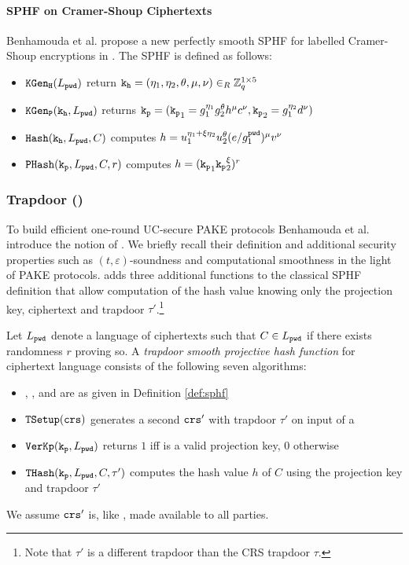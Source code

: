 \paragraph{SPHF on Cramer-Shoup Ciphertexts}
Benhamouda et al. propose a new perfectly smooth SPHF for labelled Cramer-Shoup encryptions in \cite{Benhamouda2013}.
The SPHF is defined as follows:
\begin{itemize}
  \item $\mathtt{KGen_H}(L_\mathtt{pwd})$ return $\mathtt{k_h}=(\eta_1,\eta_2,\theta,\mu,\nu)\in_R\mathbb{Z}_q^{1\times 5}$
  \item $\mathtt{KGen_P}(\mathtt{k_h}, L_\mathtt{pwd})$ returns $\mathtt{k_p}=(\mathtt{k_p}_1=g_1^{\eta_1} g_2^{\theta} h^\mu c^\nu, \mathtt{k_p}_2=g_1^{\eta_2} d^{\nu})$
  \item $\mathtt{Hash}(\mathtt{k_h}, L_\mathtt{pwd}, C)$ computes $h=u_1^{\eta_1+\xi\eta_2} u_2^{\theta} (e/g_1^{\mathtt{pwd}})^\mu v^\nu$
  \item $\mathtt{PHash}(\mathtt{k_p}, L_\mathtt{pwd}, C, r)$ computes $h=(\mathtt{k_p}_1 \mathtt{k_p}_2^\xi)^r$
\end{itemize}

\subsubsection{Trapdoor \SPHF (\TSPHF)}\label{sec:tsphf}
To build efficient one-round UC-secure PAKE protocols Benhamouda et al. \cite{Benhamouda2013} introduce the notion of \TSPHF.
We briefly recall their definition and additional security properties such as $(t,\varepsilon)$-soundness and computational smoothness in the light of PAKE protocols.
\TSPHF adds three additional functions to the classical SPHF definition that allow computation of the hash value knowing only the projection key, ciphertext and trapdoor $\tau'$.\footnote{Note that $\tau'$ is a different trapdoor than the CRS trapdoor $\tau$.}

\begin{definition}\label{def:tsphf}
Let $L_\mathtt{pwd}$ denote a language of ciphertexts such that $C\in L_\mathtt{pwd}$ if there exists randomness $r$ proving so.
A \emph{trapdoor smooth projective hash function} for ciphertext language \Lpwd consists of the following seven algorithms:

\begin{itemize}
  \item \HKGen, \PKGen, \Hash and \PHash are as given in Definition \ref{def:sphf}
	\item $\mathtt{TSetup}(\mathtt{crs})$ generates a second $\mathtt{crs}'$ with trapdoor $\tau'$ on input of a \crs
	\item $\mathtt{VerKp}(\mathtt{k_p}, L_\mathtt{pwd})$ returns $1$ iff \hp is a valid projection key, $0$ otherwise
	\item $\mathtt{THash}(\mathtt{k_p}, L_\mathtt{pwd}, C, \tau')$ computes the hash value $h$ of $C$ using the projection key \hp and trapdoor $\tau'$
\end{itemize}

\noindent
We assume $\mathtt{crs}'$ is, like \crs, made available to all parties.
\end{definition}


